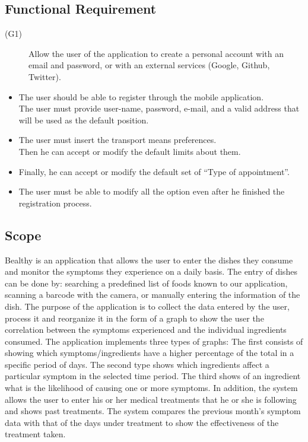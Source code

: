 \documentclass [12pt]{article}
\begin{document}
\subsection{Functional Requirement}
\begin{description}
\item[(G1)]Allow the user of the application to create a personal account with an email and password, or with an external services (Google, Github, Twitter).


\end{description}
\begin{itemize}
\item The user should be able to register through the mobile application.\\
The user must provide user-name, password, e-mail, and a valid address that will be used as the default position.\\
\item The user must insert the transport means preferences.\\
Then he can accept or modify the default limits about them.\\
\item Finally, he can accept or modify the default set of “Type of appointment”.\\
\item The user must be able to modify all the option even after he finished the registration process.\\
\end{itemize}
\subsection{Scope}
Bealthy is an application that allows the user to enter the dishes they consume and monitor the symptoms they experience on a daily basis. 
The entry of dishes can be done by: searching a predefined list of foods known to our application, scanning a barcode with the camera, or manually entering the information of the dish.
The purpose of the application is to collect the data entered by the user, process it and reorganize it in the form of a graph to show the user the correlation between the symptoms experienced and the individual ingredients consumed.
The application implements three types of graphs:
The first consists of showing which symptoms/ingredients have a higher percentage of the total in a specific period of days.
The second type shows which ingredients affect a particular symptom in the selected time period.
The third shows of an ingredient what is the likelihood of causing one or more symptoms.
In addition, the system allows the user to enter his or her medical treatments that he or she is following and shows past treatments.
The system compares the previous month's symptom data with that of the days under treatment to show the effectiveness of the treatment taken.
\end{document}

